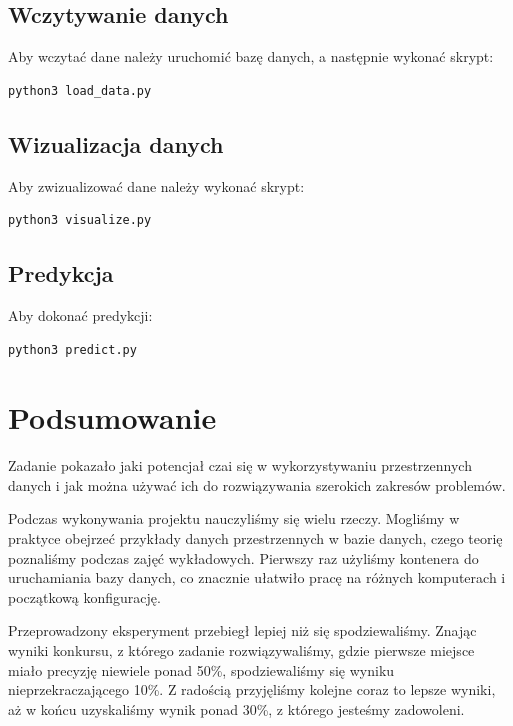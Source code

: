 \documentclass[a4paper,12pt]{mwart}
\begin{document}
\subsection{Wczytywanie danych}
Aby wczytać dane należy uruchomić bazę danych, a następnie wykonać skrypt:
\begin{lstlisting}
python3 load_data.py
\end{lstlisting}

\subsection{Wizualizacja danych}
Aby zwizualizować dane należy wykonać skrypt:
\begin{lstlisting}
python3 visualize.py
\end{lstlisting}

\subsection{Predykcja}
Aby dokonać predykcji:
\begin{lstlisting}
python3 predict.py
\end{lstlisting}

\section{Podsumowanie}
Zadanie pokazało jaki potencjał czai się w wykorzystywaniu przestrzennych danych i jak można używać ich do rozwiązywania szerokich zakresów problemów.

Podczas wykonywania projektu nauczyliśmy się wielu rzeczy. Mogliśmy w praktyce obejrzeć przykłady danych przestrzennych w bazie danych, czego teorię poznaliśmy podczas zajęć wykładowych. Pierwszy raz użyliśmy kontenera do uruchamiania bazy danych, co znacznie ułatwiło pracę na różnych komputerach i początkową konfigurację.

Przeprowadzony eksperyment przebiegł lepiej niż się spodziewaliśmy. Znając wyniki konkursu, z którego zadanie rozwiązywaliśmy, gdzie pierwsze miejsce miało precyzję niewiele ponad 50\%, spodziewaliśmy się wyniku nieprzekraczającego 10\%. Z radością przyjęliśmy kolejne coraz to lepsze wyniki, aż w końcu uzyskaliśmy wynik ponad 30\%, z którego jesteśmy zadowoleni.
\end{document}
